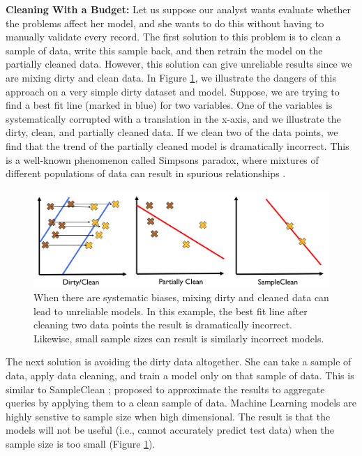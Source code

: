 \noindent\textbf{Cleaning With a Budget: }  Let us suppose our analyst wants evaluate whether the problems affect her model, and she wants to do this without having to manually validate every record. The first solution to this problem is to clean a sample of data, write this sample back, and then retrain the model on the partially cleaned data.
However, this solution can give unreliable results since we are mixing dirty and clean data.
In Figure \ref{update-arch1}, we illustrate the dangers of this approach on a very simple dirty dataset and model.
Suppose, we are trying to find a best fit line (marked in blue) for two variables. 
One of the variables is systematically corrupted with a translation in the x-axis, and we illustrate the dirty, clean, and partially cleaned data.
If we clean two of the data points, we find that the trend of the partially cleaned model is dramatically incorrect.
This is a well-known phenomenon called Simpsons paradox, where mixtures of different populations of data can result in spurious relationships \cite{simpson1951interpretation}.

\begin{figure}[ht!]
\centering
 \includegraphics[width=\columnwidth]{figs/update-arch.png}
 \caption{When there are systematic biases, mixing dirty and cleaned data can lead to unreliable models. In this example, the best fit line after cleaning two data points the result is dramatically incorrect. Likewise, small sample sizes can result is similarly incorrect models. \label{update-arch1}}
\end{figure}

The next solution is avoiding the dirty data altogether.
She can take a sample of data, apply data cleaning, and train a model only on that sample of data.
This is similar to SampleClean \cite{wang1999sample}; proposed to approximate the results to aggregate queries by applying them to a clean sample of data.
Machine Learning models are highly senstive to sample size when high dimensional.
The result is that the models will not be useful (i.e., cannot accurately predict test data) when the sample size is too small (Figure \ref{update-arch1}).

